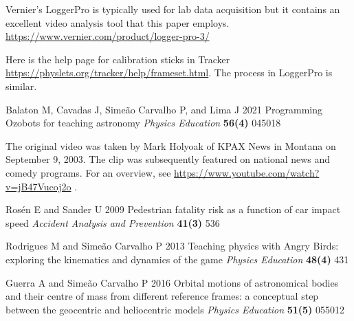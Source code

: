 \documentclass[12pt]{iopart}
\begin{document}
\begin{thebibliography}{99}
 Vernier's LoggerPro is typically used for lab data acquisition but it contains an excellent video analysis tool that this paper employs. 
\url{https://www.vernier.com/product/logger-pro-3/}

 Here is the help page for calibration sticks in Tracker \url{https://physlets.org/tracker/help/frameset.html}.  The process in LoggerPro is similar.

Balaton M, Cavadas J, Simeão Carvalho P, and Lima J
2021
Programming Ozobots for teaching astronomy
{\it Physics Education}
\textbf{56(4)}
045018

The original video was taken by Mark Holyoak of KPAX News in Montana on September 9, 2003.  The clip was subsequently featured on national news and comedy programs.  For an overview, see \url{https://www.youtube.com/watch?v=jB47Vucoj2o} .
   
Rosén E and Sander U
2009
Pedestrian fatality risk as a function of car impact speed
{\it Accident Analysis and Prevention}
\textbf{41(3)} 
536

Rodrigues M and Simeão Carvalho P 
2013
Teaching physics with Angry Birds: exploring the kinematics and dynamics of the game
{\it Physics Education}
\textbf{48(4)}
431

Guerra A and Simeão Carvalho P
2016
Orbital motions of astronomical bodies and their centre of mass from different reference frames: a conceptual step between the geocentric and heliocentric models
{\it Physics Education}
\textbf{51(5)}
055012

\end{thebibliography}
\end{document}
